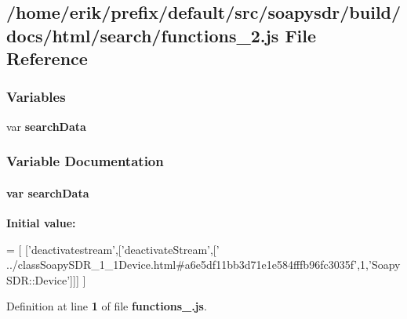 \subsection{/home/erik/prefix/default/src/soapysdr/build/docs/html/search/functions\+\_\+2.js File Reference}
\label{functions__2_8js}
\subsubsection*{Variables}
\begin{DoxyCompactItemize}
\item 
var {\bf search\+Data}
\end{DoxyCompactItemize}


\subsubsection{Variable Documentation}
\paragraph[{search\+Data}]{\setlength{\rightskip}{0pt plus 5cm}var search\+Data}\label{functions__2_8js_ad01a7523f103d6242ef9b0451861231e}
{\bfseries Initial value\+:}
\begin{DoxyCode}
=
[
  [\textcolor{stringliteral}{'deactivatestream'},[\textcolor{stringliteral}{'deactivateStream'},[\textcolor{stringliteral}{'
      ../classSoapySDR\_1\_1Device.html#a6e5df11bb3d71e1e584fffb96fc3035f'},1,\textcolor{stringliteral}{'SoapySDR::Device'}]]]
]
\end{DoxyCode}


Definition at line {\bf 1} of file {\bf functions\+\_.\+js}.

